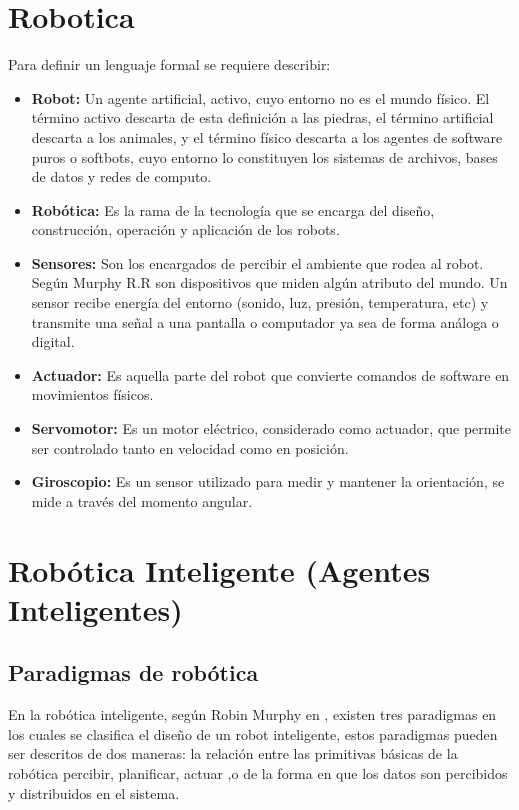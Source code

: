 \section{Robotica} \label{sect:robotica}
 
Para definir un lenguaje formal se requiere describir:
\begin{itemize}
\item{\textbf{Robot:} Un agente artificial, activo, cuyo entorno no es el mundo físico. El término activo descarta de esta definición a las piedras, el término artificial descarta a los animales, y el término físico descarta a los agentes de software puros o softbots, cuyo entorno lo constituyen los sistemas de archivos, bases de datos y redes de computo. \cite{peterNorvig}}

\item{\textbf{Robótica:} Es la rama de la tecnología que se encarga del diseño, construcción, operación y aplicación de los robots. \cite{oxfordRobotics}}

\item{\textbf{Sensores:}  Son los encargados de percibir el ambiente que rodea al robot. Según Murphy R.R son dispositivos que miden algún atributo del mundo. Un sensor recibe energía del entorno (sonido, luz, presión, temperatura, etc) y transmite una señal a una pantalla o computador ya sea de forma análoga o digital. \cite{AiRobotics}}

\item{\textbf{Actuador:}  Es aquella parte del robot que convierte comandos de software en movimientos físicos.  \cite{peterNorvig}}

\item{\textbf{Servomotor:}  Es un motor eléctrico, considerado como actuador, que permite ser controlado tanto en velocidad como en posición. }
\item{\textbf{Giroscopio:} Es un sensor utilizado para medir y mantener la orientación, se mide a través del momento angular. \cite{gyro1}}
\end{itemize}

\section{Robótica Inteligente (Agentes Inteligentes)} \label{sect:AgentesInteligentes}
\subsection{Paradigmas de robótica}
En la robótica inteligente, según Robin Murphy en \cite{AiRobotics}, existen tres paradigmas en los cuales se clasifica el diseño de un robot inteligente, estos paradigmas pueden ser descritos de dos maneras: la relación entre las primitivas básicas de la robótica  percibir, planificar, actuar ,o de la forma en que los datos son percibidos y distribuidos en el sistema.

